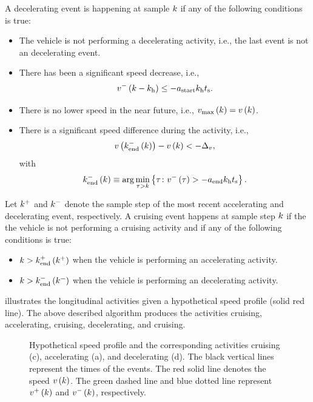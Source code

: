 A decelerating event is happening at sample $k$ if any of the following conditions is true:
\begin{itemize}
	\item The vehicle is not performing a decelerating activity, i.e., the last event is not an decelerating event.
	\item \cstarta There has been a significant speed decrease, i.e., 
	\begin{equation}
		\label{eq:start deceleration}
		v^{-}\left(k-k_{\mathrm{h}}\right) \leq -a_\mathrm{start}k_{\mathrm{h}}t_\mathrm{s}.
	\end{equation} \cenda
	\item There is no lower speed in the near future, i.e., $v_\mathrm{max}\left(k\right)=v\left(k\right)$.
	\item There is a significant speed difference during the activity, i.e., 
	\begin{equation}
		v\left(k_{\mathrm{end}}^{-}\left(k\right)\right) - v\left(k\right) < -\Delta_{v},
	\end{equation}
	with
	\begin{equation}
		\label{eq:end deceleration}
		k_{\mathrm{end}}^{-}\left(k\right) \equiv \arg \min_{\tau > k} \left\{ \tau\colon v^{-}\left(\tau\right) > -a_\mathrm{end}k_{\mathrm{h}}t_\mathrm{s} \right\}.
	\end{equation}
\end{itemize}

Let $k^{+}$ and $k^{-}$ denote the sample step of the most recent accelerating and decelerating event, respectively. A cruising event happens at sample step $k$ if the the vehicle is not performing a cruising activity and if any of the following conditions is true:
\begin{itemize}
	\item $k > k_{\mathrm{end}}^{+}\left(k^{+}\right)$ when the vehicle is performing an accelerating activity.
	\item $k > k_{\mathrm{end}}^{-}\left(k^{-}\right)$ when the vehicle is performing an decelerating activity.
\end{itemize}

\cstarta%
 illustrates the longitudinal activities given a hypothetical speed profile (solid red line). The above described algorithm produces the activities cruising, accelerating, cruising, decelerating, and cruising.
\cenda

\setlength{\figurewidth}{\linewidth}
\setlength{\figureheight}{0.7\linewidth}
\begin{figure}
	\centering
	
	\caption{\cstarta Hypothetical speed profile and the corresponding activities cruising (c), accelerating (a), and decelerating (d). The black vertical lines represent the times of the events. The red solid line denotes the speed $v\left(k\right)$. The green dashed line and blue dotted line represent $v^{+}\left(k\right)$ and $v^{-}\left(k\right)$, respectively.\cenda}
	\label{fig:longitudinal activities}
\end{figure}


